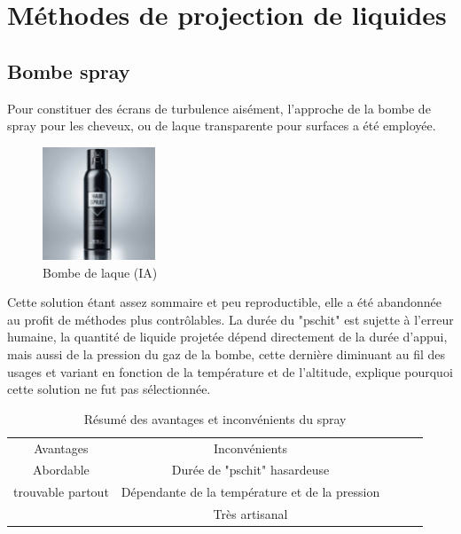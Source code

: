 

\section{Méthodes de projection de liquides}\label{sec:etat de lart}
\subsection{Bombe spray}
Pour constituer des écrans de turbulence aisément, l'approche de la bombe de spray pour les cheveux, ou de laque transparente pour surfaces a été employée.
\begin{figure}[H]
    \centering
    \includegraphics[width=0.3\textwidth,trim={4cm 0 4cm 0},clip]{assets/figures/etat_art/airspray.jpeg}

    \caption{Bombe de laque (IA)}
\end{figure}
Cette solution étant assez sommaire et peu reproductible, elle a été abandonnée au profit de méthodes plus contrôlables.
La durée du "pschit" est sujette à l'erreur humaine, la quantité de liquide projetée
dépend directement de la durée d'appui, mais aussi de la pression du gaz de la bombe, cette
dernière diminuant au fil des usages et variant en fonction de la température et de l'altitude,
explique pourquoi cette solution ne fut pas sélectionnée.

\begin{table}[H]
    \centering
    \begin{tabular}{|c|c|lll}
        \cline{1-2}
        Avantages                                 & Inconvénients                                                          &  &  & \\ \cline{1-2}
        \cellcolor[HTML]{67FD9A}Abordable         & \cellcolor[HTML]{FD6864}Durée de "pschit" hasardeuse                   &  &  & \\ \cline{1-2}
        \cellcolor[HTML]{67FD9A}trouvable partout & \cellcolor[HTML]{FD6864}Dépendante de la température et de la pression &  &  & \\ \cline{1-2}
                                                  & \cellcolor[HTML]{FD6864}Très artisanal                                 &  &  & \\ \cline{1-2}
    \end{tabular}
    \caption{Résumé des avantages et inconvénients du spray}
    \label{tab:hair_spray_table}
\end{table}


